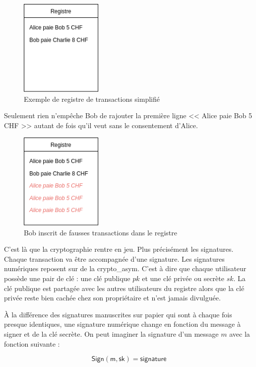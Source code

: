 \begin{figure}[H]
  \centering
  \includegraphics[width=4cm]{images/crypto_1.png}
  \caption{Exemple de registre de transactions simplifié}
\end{figure}

Seulement rien n'empêche Bob de rajouter la première ligne << Alice paie Bob 5 CHF >> autant de fois qu'il veut sans le consentement d'Alice.

\begin{figure}[H]
  \centering
  \includegraphics[width=4cm]{images/crypto_2.png}
  \caption{Bob inscrit de fausses transactions dans le registre}
\end{figure}

C'est là que la cryptographie rentre en jeu. Plus précisément les \glspl{signature}. Chaque transaction va être accompagnée d'une signature. Les signatures numériques reposent sur de la \gls{crypto_asym}. C'est à dire que chaque utilisateur possède une pair de clé : une clé publique $pk$ et une clé privée ou secrète $sk$. La clé publique est partagée avec les autres utilisateurs du registre alors que la clé privée reste bien cachée chez son propriétaire et n'est jamais divulguée.

À la différence des signatures manuscrites sur papier qui sont à chaque fois presque identiques, une signature numérique change en fonction du message à signer et de la clé secrète. On peut imaginer la signature d'un message $m$ avec la fonction suivante :

\begin{equation*}
  \mathsf{Sign(m, sk)} = \mathsf{signature}
\end{equation*}

